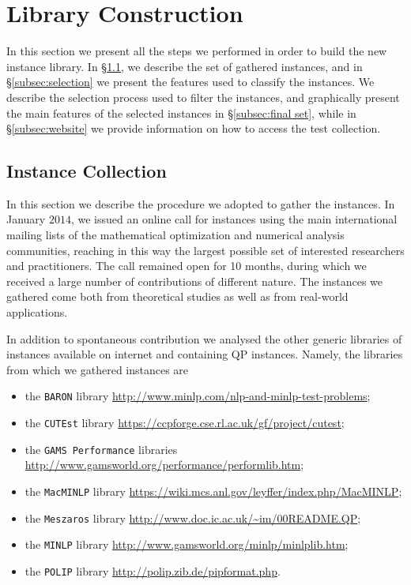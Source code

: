 \section{Library Construction}\label{sec:lib}

In this section we present all the steps we performed in order to build
the new instance library. In \S\ref{subsec:instColl}, we describe the set
of gathered instances, and
in \S\ref{subsec:selection} we present the features used to
classify the instances.
We describe the selection process used to filter the instances, and
graphically present the main features of the selected instances in
\S\ref{subsec:final set}, while in \S\ref{subsec:website}
we provide information on how to access the test collection.

\subsection{Instance Collection}\label{subsec:instColl}

In this section we describe the procedure we adopted to gather the
instances. In January $2014$, we issued an online call for instances
using the main international mailing lists of the mathematical
optimization and numerical analysis communities, reaching in this way
the largest possible set of interested researchers and practitioners.
The call remained open for 10 months, during which we received a large
number of contributions of different nature. The instances we gathered
come both from theoretical studies as well as from real-world
applications.

In addition to spontaneous contribution we analysed the other generic
libraries of instances available  on internet and containing QP
instances. Namely, the libraries from which we gathered instances are
%
\begin{itemize}
 \item the \texttt{BARON} library
 \url{http://www.minlp.com/nlp-and-minlp-test-problems};
%
\item the \texttt{CUTEst} library
 \url{https://ccpforge.cse.rl.ac.uk/gf/project/cutest};
%
\item the \texttt{GAMS Performance} libraries
 \url{http://www.gamsworld.org/performance/performlib.htm};
%
\item the \texttt{MacMINLP} library
 \url{https://wiki.mcs.anl.gov/leyffer/index.php/MacMINLP};
%
\item the \texttt{Meszaros} library
 \url{http://www.doc.ic.ac.uk/~im/00README.QP};
%
\item the \texttt{MINLP} library
 \url{http://www.gamsworld.org/minlp/minlplib.htm};
%
\item the \texttt{POLIP} library
 \url{http://polip.zib.de/pipformat.php}.
\end{itemize}

